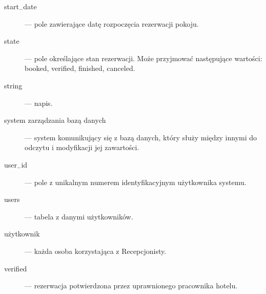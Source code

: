 \documentclass [11pt, a4paper, leqno] {article}
\begin{document}
\begin{description}
\item[start$_{-}$date] --- pole zawierające datę rozpoczęcia rezerwacji pokoju.

\item[state] --- pole określające stan rezerwacji. Może przyjmować następujące wartości: booked, verified, finished, canceled.

\item[string] --- napis.

\item[system zarządzania bazą danych] --- system komunikujący się z bazą danych, który służy między innymi do odczytu i modyfikacji jej zawartości.

\item[user$_{-}$id] --- pole z unikalnym numerem identyfikacyjnym użytkownika systemu.

\item[users] --- tabela z danymi użytkowników.

\item[użytkownik] --- każda osoba korzystająca z Recepcjonisty.

\item[verified] --- rezerwacja potwierdzona przez uprawnionego pracownika hotelu.

\end{description}
\end{document}
